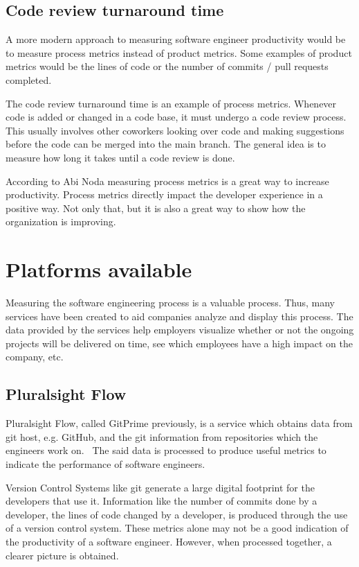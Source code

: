 \documentclass{article}
\begin{document}
\subsection{Code review turnaround time}
A more modern approach to measuring software engineer productivity would be to
measure process metrics instead of product metrics. Some examples of product
metrics would be the lines of code or the number of commits / pull requests
completed.

The code review turnaround time is an example of process metrics. Whenever code
is added or changed in a code base, it must undergo a code review process. This
usually involves other coworkers looking over code and making suggestions
before the code can be merged into the main branch. The general idea is to
measure how long it takes until a code review is done.

According to Abi Noda measuring process metrics is a great way to increase
productivity. Process metrics directly impact the developer experience in a
positive way. Not only that, but it is also a great way to show how the
organization is improving.~\cite{elusive2019quest}

\section{Platforms available}
Measuring the software engineering process is a valuable process. Thus, many
services have been created to aid companies analyze and display this process.
The data provided by the services help employers visualize whether or not the
ongoing projects will be delivered on time, see which employees have a high
impact on the company, etc.

\subsection{Pluralsight Flow}
Pluralsight Flow, called GitPrime previously, is a service which obtains data
from git host, e.g. GitHub, and the git information from repositories which the
engineers work on.~\cite{plural2019sight} The said data is processed to produce
useful metrics to indicate the performance of software engineers.

Version Control Systems like git generate a large digital footprint for the
developers that use it. Information like the number of commits done by a
developer, the lines of code changed by a developer, is produced through the
use of a version control system. These metrics alone may not be a good
indication of the productivity of a software engineer. However, when processed
together, a clearer picture is obtained.
\end{document}
